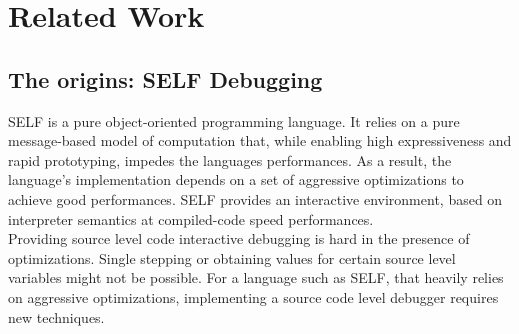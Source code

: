 
\chapter{Related Work} %

\label{Chapter3} %


\newcommand{\keyword}[1]{\textbf{#1}}
\newcommand{\tabhead}[1]{\textbf{#1}}
\newcommand{\code}[1]{\texttt{#1}}
\newcommand{\file}[1]{\texttt{\bfseries#1}}
\newcommand{\option}[1]{\texttt{\itshape#1}}

\section{The origins: SELF Debugging}\label{SELF}
SELF is a pure object-oriented programming language.
It relies on a pure message-based model of computation that, while enabling high expressiveness and rapid prototyping, impedes the languages performances\cite{chambers1991making, holzle1991optimizing}.
As a result, the language's implementation depends on a set of aggressive optimizations to achieve good performances\cite{chambers1992design, holzle1992debugging}.
SELF provides an interactive environment, based on interpreter semantics at compiled-code speed performances.\\

Providing source level code interactive debugging is hard in the presence of optimizations.
Single stepping or obtaining values for certain source level variables might not be possible.
For a language such as SELF, that heavily relies on aggressive optimizations, implementing a source code level debugger requires new techniques.\\

